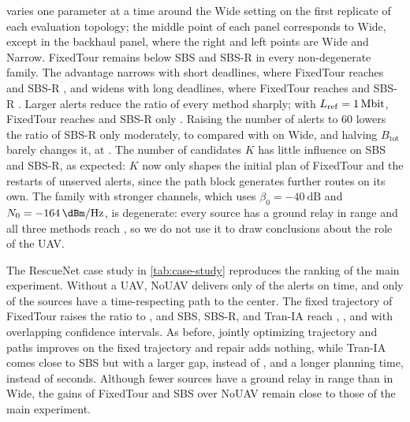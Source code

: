  varies one parameter at a time around the Wide setting on the first replicate of each evaluation topology; the middle point of each panel corresponds to Wide, except in the backhaul panel, where the right and left points are Wide and Narrow. FixedTour remains below SBS and SBS-R in every non-degenerate family. The advantage narrows with short deadlines, where FixedTour reaches \ResultTwoSensSensDeadlineShortBone{} and SBS-R \ResultTwoSensSensDeadlineShortP, and widens with long deadlines, where FixedTour reaches \ResultTwoSensSensDeadlineLongBone{} and SBS-R \ResultTwoSensSensDeadlineLongP. Larger alerts reduce the ratio of every method sharply; with $L_{\mathrm{ref}}=\qty{1}{\mega\bit}$, FixedTour reaches \ResultTwoSensSensLrefonemBone{} and SBS-R only \ResultTwoSensSensLrefonemP. Raising the number of alerts to 60 lowers the ratio of SBS-R only moderately, to \ResultTwoSensSensAlertssixzeroP{} compared with \ResultTwoSensVzeroP{} on Wide, and halving $B_{\mathrm{tot}}$ barely changes it, at \ResultTwoSensSensBtotzerofiveP. The number of candidates $K$ has little influence on SBS and SBS-R, as expected: $K$ now only shapes the initial plan of FixedTour and the restarts of unserved alerts, since the path block generates further routes on its own. The family with stronger channels, which uses $\beta_0=\qty{-40}{\dB}$ and $N_0=\qty{-164}{\dBm\per\hertz}$, is degenerate: every source has a ground relay in range and all three methods reach \ResultTwoSensSensPhysicalP, so we do not use it to draw conclusions about the role of the UAV.

\label{sec:results-case-study}


The RescueNet case study in \cref{tab:case-study} reproduces the ranking of the main experiment. Without a UAV, NoUAV delivers only \ResultExtCaseTimelyBzero{} of the alerts on time, and only \ResultExtCaseConnBzero{} of the sources have a time-respecting path to the center. The fixed trajectory of FixedTour raises the ratio to \ResultExtCaseTimelyBone, and SBS, SBS-R, and Tran-IA reach \ResultExtCaseTimelyBtwo, \ResultExtCaseTimelyP, and \ResultExtCaseTimelyTRAN{} with overlapping confidence intervals. As before, jointly optimizing trajectory and paths improves on the fixed trajectory and repair adds nothing, while Tran-IA comes close to SBS but with a larger gap, \ResultExtCaseGapTRAN{} instead of \ResultExtCaseGapBtwo, and a longer planning time, \ResultExtCasePlanningTRAN{} instead of \ResultExtCasePlanningBtwo{} seconds. Although fewer sources have a ground relay in range than in Wide, the gains of FixedTour and SBS over NoUAV remain close to those of the main experiment.

